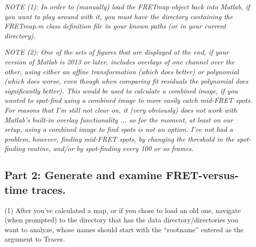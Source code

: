 \documentclass[11pt]{article}
\begin{document}
{\it NOTE (1): In order to (manually) load the FRETmap object back into Matlab, if you want to play around with it, you must have the directory containing the FRETmap.m class definition file in your known paths (or in your current directory).}

{\it NOTE (2): One of the sets of figures that are displayed at the end, if your version of Matlab is 2013 or later, includes overlays of one channel over the other, using either an affine transformation (which does better) or polynomial (which does worse, even though when comparing fit residuals the polynomial does significantly better).  This would be used to calculate a combined image, if you wanted to spot-find using a combined image to more easily catch mid-FRET spots.  For reasons that I'm still not clear on, it (very obviously) does not work with Matlab's built-in overlay functionality ... so for the moment, at least on our setup, using a combined image to find spots is not an option. I've not had a problem, however, finding mid-FRET spots, by changing the threshold in the spot-finding routine, and/or by spot-finding every 100 or so frames.}

\subsection{Part 2: Generate and examine FRET-versus-time traces.}

(1) After you've calculated a map, or if you chose to load an old one, navigate (when prompted) to the directory that has the data directory/directories you want to analyze, whose names should start with the ``rootname'' entered as the argument to Traces.
\end{document}
